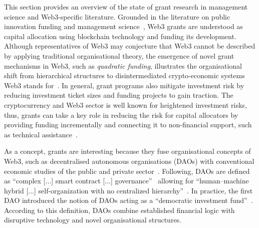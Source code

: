 \documentclass[conference]{IEEEtran}
\begin{document}
This section provides an overview of the state of grant research in management science and Web3-specific literature. Grounded in the literature on public innovation funding and management science~\cite{albors_impact_2011,bartle_review_2003}, Web3 grants are understood as capital allocation using blockchain technology and funding its development. Although representatives of Web3 may conjecture that Web3 cannot be described by applying traditional organisational theory, the emergence of novel grant mechanisms in Web3, such as \textit{quadratic funding}, illustrates the organisational shift from hierarchical structures to disintermediated crypto-economic systems Web3 stands for~\cite[p.~501]{shermin_disrupting_2017}. In general, grant programs also mitigate investment risk by reducing investment ticket sizes and funding projects to gain traction. The cryptocurrency and Web3 sector is well known for heightened investment risks, thus, grants can take a key role in reducing the risk for capital allocators by providing funding incrementally and connecting it to non-financial support, such as technical assistance~\cite[p.~6]{gilbert_sustainable_2019}.

As a concept, grants are interesting because they fuse organisational concepts of Web3, such as decentralised autonomous organisations (DAOs) with conventional economic studies of the public and private sector~\cite{ding_desci_2022,monteiro_decentralised_2023,wang_self-sovereign_2020}. Following, DAOs are defined as “complex [...] smart contract [...] governance”~\cite[p.~501]{shermin_disrupting_2017} allowing for “human–machine hybrid [...] self-organization with no centralized hierarchy”~\cite[p.~1564]{ding_desci_2022}. In practice, the first DAO introduced the notion of DAOs acting as a “democratic investment fund”~\cite[p.~4]{santos_dao_2018}. According to this definition, DAOs combine established financial logic with disruptive technology and novel organisational structures. 
\end{document}
